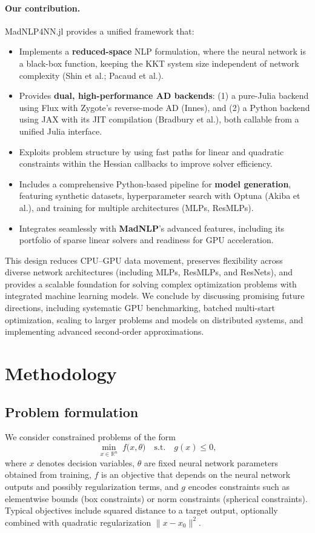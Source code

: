 \documentclass[11pt]{article}
\begin{document}
\paragraph{Our contribution.} MadNLP4NN.jl provides a unified framework that:
\begin{itemize}[leftmargin=1.5em]
  \item Implements a \textbf{reduced-space} NLP formulation, where the neural network is a black-box function, keeping the KKT system size independent of network complexity (Shin et al.; Pacaud et al.).
  \item Provides \textbf{dual, high-performance AD backends}: (1) a pure-Julia backend using Flux with Zygote's reverse-mode AD (Innes), and (2) a Python backend using JAX with its JIT compilation (Bradbury et al.), both callable from a unified Julia interface.
  \item Exploits problem structure by using fast paths for linear and quadratic constraints within the Hessian callbacks to improve solver efficiency.
  \item Includes a comprehensive Python-based pipeline for \textbf{model generation}, featuring synthetic datasets, hyperparameter search with Optuna (Akiba et al.), and training for multiple architectures (MLPs, ResMLPs).
  \item Integrates seamlessly with \textbf{MadNLP}'s advanced features, including its portfolio of sparse linear solvers and readiness for GPU acceleration.
\end{itemize}
This design reduces CPU–GPU data movement, preserves flexibility across diverse network architectures (including MLPs, ResMLPs, and ResNets), and provides a scalable foundation for solving complex optimization problems with integrated machine learning models. We conclude by discussing promising future directions, including systematic GPU benchmarking, batched multi-start optimization, scaling to larger problems and models on distributed systems, and implementing advanced second-order approximations.

\section{Methodology}
\subsection{Problem formulation}
We consider constrained problems of the form
\begin{equation}
  \label{eq:base}
  \min_{x \in \mathbb{R}^n} \; f\big(x, \theta\big) \quad \text{s.t.} \quad g(x) \le 0,
\end{equation}
where $x$ denotes decision variables, $\theta$ are fixed neural network parameters obtained from training, $f$ is an objective that depends on the neural network outputs and possibly regularization terms, and $g$ encodes constraints such as elementwise bounds (box constraints) or norm constraints (spherical constraints). Typical objectives include squared distance to a target output, optionally combined with quadratic regularization $\lVert x - x_0 \rVert^2$.
\end{document}
